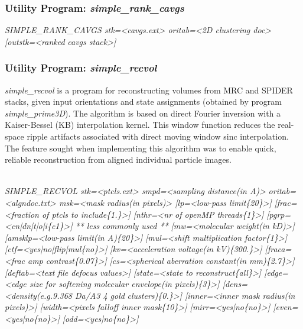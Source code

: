 \documentclass[review]{elsarticle}
\begin{document}
{{\subsubsection{Utility Program: {\it{simple\_rank\_cavgs}}}
\label{rank_cavgs}
{\it{SIMPLE\_RANK\_CAVGS stk=<cavgs.ext> oritab=<2D clustering doc> [outstk=<ranked}}
{\it{cavgs stack>]}}

\subsubsection{Utility Program: {\it{simple\_recvol}}}
\label{recvol}
{\it{simple\_recvol}} is a program for reconstructing volumes from MRC and SPIDER stacks, given input orientations and state assignments (obtained by program {\it{simple\_prime3D}}). The algorithm is based on direct Fourier inversion with a Kaiser-Bessel (KB) interpolation kernel. This window function reduces the real-space ripple artifacts associated with direct moving window sinc interpolation. The feature sought when implementing this algorithm was to enable quick, reliable reconstruction from aligned individual particle images.}\\
{\it{SIMPLE\_RECVOL stk=<ptcls.ext> smpd=<sampling distance(in A)>}}
{\it{oritab=<algndoc.txt> msk=<mask radius(in pixels)> [lp=<low-pass limit\{20\}>]}}
{\it{[frac=<fraction of ptcls to include\{1.\}>] [nthr=<nr of openMP threads\{1\}>]}}
{\it{[pgrp=<cn|dn|t|o|i\{c1\}>]}}
{\it{** less commonly used **}}
{\it{[mw=<molecular weight(in kD)>] [amsklp=<low-pass limit(in A)\{20\}>]}}
{\it{[mul=<shift multiplication factor\{1\}>] [ctf=<yes|no|flip|mul\{no\}>]}}
{\it{[kv=<acceleration voltage(in kV)\{300.\}>] [fraca=<frac amp contrast\{0.07\}>]}}
{\it{[cs=<spherical aberration constant(in mm)\{2.7\}>] [deftab=<text file defocus}}
{\it{values>] [state=<state to reconstruct\{all\}>] [edge=<edge size for softening}}
{\it{molecular envelope(in pixels)\{3\}>] [dens=<density(e.g.9.368 Da/A3 4 gold}}
{\it{clusters)\{0.\}>] [inner=<inner mask radius(in pixels)>] [width=<pixels falloff}}
{\it{inner mask\{10\}>] [mirr=<yes|no\{no\}>] [even=<yes|no\{no\}>]}}
{\it{[odd=<yes|no\{no\}>]}}
\\\\
}
\end{document}
